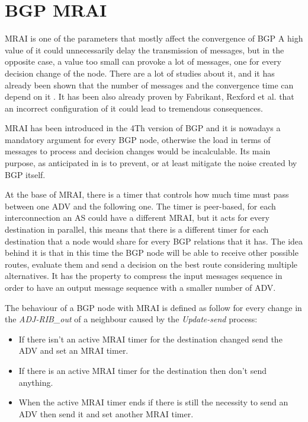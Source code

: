 \section{BGP MRAI}
\label{sec:bgp_mrai}

\ac{MRAI} is one of the parameters that mostly affect the convergence of \ac{BGP}
A high value of it could unnecessarily delay the transmission of messages, but
in the opposite case, a value too small can provoke a lot of messages, one for
every decision change of the node.
There are a lot of studies about it, and it has already been shown that
the number of messages and the convergence time can depend on it \cite{griffin2001experimental}.
It has been also already proven by Fabrikant, Rexford et al. \cite{fabrikant2011there}
that an incorrect configuration of it could lead to tremendous consequences.

\ac{MRAI} has been introduced in the \num{4}Th version of \ac{BGP} \cite{rfc4271} and
it is nowadays a mandatory argument for every \ac{BGP} node, otherwise the load
in terms of messages to process and decision changes would be incalculable.
Its main purpose, as anticipated in  is to prevent, or
at least mitigate the noise created by \ac{BGP} itself.

At the base of \ac{MRAI}, there is a timer that controls how much time must pass
between one \ac{ADV} and the following one.
The timer is peer-based, for each interconnection an \ac{AS} could have a different
\ac{MRAI}, but it acts for every destination in parallel, this means that there
is a different timer for each destination that a node would share for every
\ac{BGP} relations that it has.
The idea behind it is that in this time the \ac{BGP} node will be able
to receive other possible routes, evaluate them and send a decision on the
best route considering multiple alternatives.
It has the property to compress the input messages sequence in order to have
an output message sequence with a smaller number of \ac{ADV}.

The behaviour of a \ac{BGP} node with \ac{MRAI} is defined as follow for every
change in the \textit{ADJ-RIB\_out} of a neighbour caused by the
\textit{Update-send} process:
\begin{itemize}
	\item If there isn't an active \ac{MRAI} timer for the destination changed
		send the \ac{ADV} and set an \ac{MRAI} timer.
	\item If there is an active \ac{MRAI} timer for the destination then
		don't send anything.
	\item When the active \ac{MRAI} timer ends if there is still the necessity
		to send an \ac{ADV} then send it and set another \ac{MRAI} timer.
\end{itemize}

